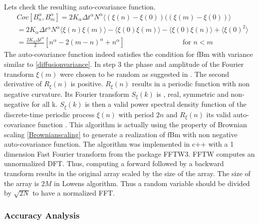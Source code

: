 \documentclass[
  a4paper,BCOR10mm,oneside,
  bibtotoc,idxtotoc,
  headsepline,footsepline,%
  fleqn,openbib
]{scrbook}
\begin{document}
Lets check the resulting auto-covariance function. 
\begin{align}
  & Cov[B^{\alpha}_n,B^{\alpha}_m]= 2 K_{\alpha} \Delta t^{\alpha} N^{\alpha} \langle (\xi(n)- \xi(0)) ((\xi(m)- \xi(0))\rangle \\
 &=  2 K_{\alpha} \Delta t^{\alpha} N^{\alpha}\langle\xi(n)\xi(m)\rangle -\langle \xi(0) \xi(m)\rangle - \langle \xi(0) \xi(n)\rangle +\langle \xi(0)^2\rangle \\ 
 &=\frac{2 K_{\alpha} \Delta t^{\alpha}}{2}[n^{\alpha}-2(m-n)^{\alpha}+n^{\alpha}]\qquad \qquad \qquad \qquad  \text{ for }  n < m
\end{align}
The auto-covariance function indeed satisfies the condition for fBm with variance similar to \cref{diffusionvariance}. In step 3 the phase and amplitude of the Fourier transform  $\xi(m)$ were chosen to be random  as suggested in \cite{Timmer1995}. The second derivative of $R_{\xi}(n) $ is positive. $R_{\xi}(n) $ results in a periodic function with non negative curvature. Its Fourier transform $S_{\xi}(k)$ is , real, symmetric  and non-negative for all k. $S_{\xi}(k)$ is then a valid power spectral density function of the discrete-time periodic process $\xi(n)$ with period $2n$ and  $R_{\xi}(n)$ its valid auto-covariance function \cite{Lowen1999}. This algorithm is actually using the property of Brownian scaling \cref{Brownianscaling} to generate a realization of fBm  with non negative auto-covariance function. The algorithm was implemented in c++ with a 1 dimension Fast Fourier transform from the package FFTW3. FFTW computes an unnormalized DFT. Thus, computing a forward followed by a backward transform results in the original array scaled by the size of the array. The size of the array is $2M$  in Lowens algorithm. Thus a random variable should be divided by $\sqrt{2N}$ to have a normalized FFT.

\subsubsection{Accuracy Analysis}
\end{document}
